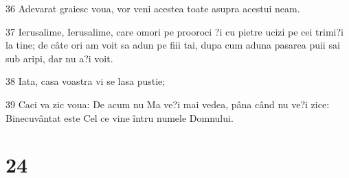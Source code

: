 \par 36 Adevarat graiesc voua, vor veni acestea toate asupra acestui neam.
\par 37 Ierusalime, Ierusalime, care omori pe prooroci ?i cu pietre ucizi pe cei trimi?i la tine; de câte ori am voit sa adun pe fiii tai, dupa cum aduna pasarea puii sai sub aripi, dar nu a?i voit.
\par 38 Iata, casa voastra vi se lasa pustie;
\par 39 Caci va zic voua: De acum nu Ma ve?i mai vedea, pâna când nu ve?i zice: Binecuvântat este Cel ce vine întru numele Domnului.

\chapter{24}

